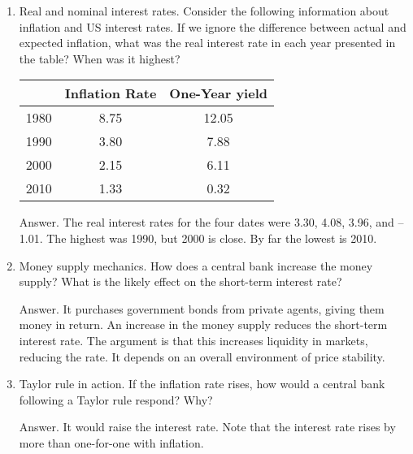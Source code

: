 \setlength{\leftmargini}{.5\oldleftmargini}
\begin{enumerate}
\item Real and nominal interest rates.
Consider the following information about inflation and US interest rates.
If we ignore the difference between actual and expected inflation,
what was the real interest rate in each year presented in the table?
When was it highest?

\begin{center}
\begin{tabular}{lcc}
\toprule
        & Inflation Rate & One-Year yield \index{bond!bond yield}
 \\
\midrule
1980 & 8.75 & 12.05\\
1990 & 3.80 & 7.88\\
2000 & 2.15 & 6.11\\
2010 & 1.33 & 0.32\\
\bottomrule
\end{tabular}
\end{center}

Answer.  The real interest rates for the four dates
were 3.30, 4.08, 3.96, and --1.01.
The highest was 1990, but 2000 is close.
By far the lowest is 2010.

\item Money supply mechanics.  How does a central bank increase the money supply?
What is the likely effect on the short-term interest rate?

Answer.
It purchases government bonds from private agents,
giving them money in return.
An increase in the money supply reduces the short-term
interest rate.
The argument is that this increases liquidity in markets, reducing
the rate.
It depends on an overall environment of price stability.

\item Taylor rule in action.  If the inflation rate rises,
how would a central bank following a Taylor rule respond?
Why?

Answer.  It would raise the interest rate.
Note that the interest rate rises by more than one-for-one
with inflation.

%


\end{enumerate}
